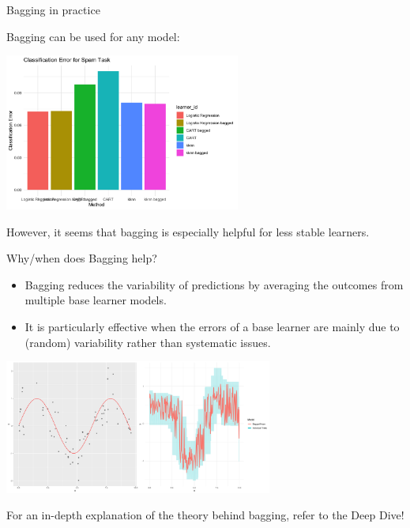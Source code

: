 \documentclass[11pt,compress,t,notes=noshow, xcolor=table]{beamer}
\begin{document}
\begin{vbframe}{Bagging in practice}

Bagging can be used for any model:

\vspace{2em}

\includegraphics[width=220pt]{figure/bagging-bench.png}

\vspace{1em}

However, it seems that bagging is especially helpful for less stable learners.

\end{vbframe}


\begin{vbframe}{Why/when does Bagging help?}

\begin{itemize}
  \item Bagging reduces the variability of predictions by averaging the outcomes from multiple base learner models.

  \item It is particularly effective when the errors of a base learner are mainly due to (random) variability rather than systematic issues.
\end{itemize}

\begin{center}
\includegraphics[width=250pt]{figure/bagging-mean.png}
\end{center}

\footnotesize{For an in-depth explanation of the theory behind bagging, refer to the Deep Dive!}

\end{vbframe}
\end{document}
